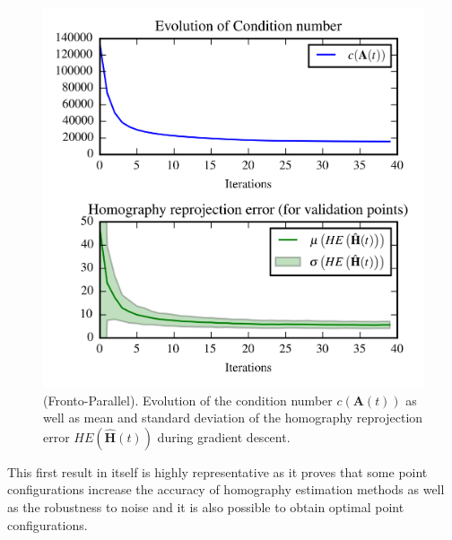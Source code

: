 \documentclass[letterpaper, 10 pt, conference]{ieeeconf}  %
\begin{document}
	\begin{figure}[t]
		\begin{center}
			\includegraphics[width=\columnwidth]{img/homography_fronto_parallel.png}
			\caption{\label{fig:FP_cond_homo_error}\small(Fronto-Parallel). Evolution of the condition number $c(\mathbf{A}(t))$ as well as mean and standard deviation of the homography reprojection error $HE\left(\hat{\mathbf{H}}(t)\right)$ during gradient descent.}
		\end{center}
		\vspace{-0.5cm}
	\end{figure}
	
	This first result in itself is highly representative as it proves that some point configurations increase the accuracy of homography estimation methods as well as the robustness to noise and it is also possible to obtain optimal point configurations. 
	
	
	
\end{document}
